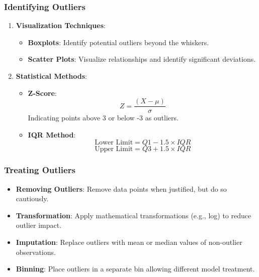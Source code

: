 \documentclass[aspectratio=169]{beamer}
\begin{document}
\begin{frame}[fragile]
    \frametitle{Identifying Outliers}
    \begin{enumerate}
        \item \textbf{Visualization Techniques}:
            \begin{itemize}
                \item \textbf{Boxplots}: Identify potential outliers beyond the whiskers.
                \item \textbf{Scatter Plots}: Visualize relationships and identify significant deviations.
            \end{itemize}
        \item \textbf{Statistical Methods}:
            \begin{itemize}
                \item \textbf{Z-Score}:
                    \begin{equation}
                    Z = \frac{(X - \mu)}{\sigma}
                    \end{equation}
                    Indicating points above 3 or below -3 as outliers.
                \item \textbf{IQR Method}:
                    \begin{equation}
                    \text{Lower Limit} = Q1 - 1.5 \times IQR
                    \end{equation}
                    \begin{equation}
                    \text{Upper Limit} = Q3 + 1.5 \times IQR
                    \end{equation}
            \end{itemize}
    \end{enumerate}
\end{frame}

\begin{frame}[fragile]
    \frametitle{Treating Outliers}
    \begin{itemize}
        \item \textbf{Removing Outliers}: Remove data points when justified, but do so cautiously.
        \item \textbf{Transformation}: Apply mathematical transformations (e.g., log) to reduce outlier impact.
        \item \textbf{Imputation}: Replace outliers with mean or median values of non-outlier observations.
        \item \textbf{Binning}: Place outliers in a separate bin allowing different model treatment.
    \end{itemize}
\end{frame}
\end{document}
